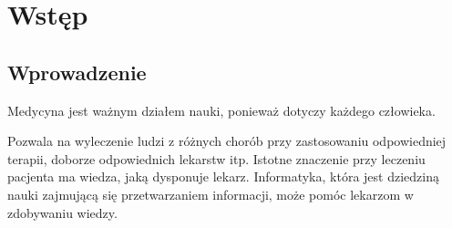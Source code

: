\chapter{Wstęp}
\section{Wprowadzenie}

\begin{spacing}{1.5}
Medycyna jest ważnym działem nauki, ponieważ dotyczy każdego człowieka.

Pozwala na wyleczenie ludzi z różnych chorób przy zastosowaniu odpowiedniej terapii, doborze odpowiednich lekarstw itp. Istotne znaczenie przy leczeniu pacjenta ma wiedza, jaką dysponuje lekarz. Informatyka, która jest dziedziną nauki zajmującą się przetwarzaniem informacji, może pomóc lekarzom w zdobywaniu wiedzy. 


\end{spacing}
